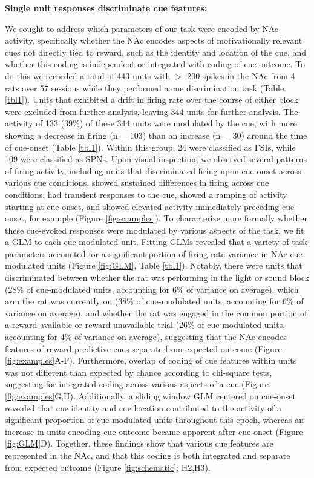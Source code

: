 \documentclass[11pt]{article}
\begin{document}
{\bf Single unit responses discriminate cue features:}

We sought to address which parameters of our task were encoded by NAc activity,
specifically whether the NAc encodes aspects of motivationally relevant cues not
directly tied to reward, such as the identity and location of the cue, and
whether this coding is independent or integrated with coding of cue outcome. To
do this we recorded a total of 443 units with $>$ 200 spikes in the NAc from 4
rats over 57 sessions while they performed a cue discrimination task (Table
\ref{tbl1}). Units that exhibited a drift in firing rate over the course of
either block were excluded from further analysis, leaving 344 units for further
analysis. The activity of 133 (39\%) of these 344 units were modulated by the
cue, with more showing a decrease in firing (n = 103) than an increase (n = 30)
around the time of cue-onset (Table \ref{tbl1}). Within this group, 24 were
classified as FSIs, while 109 were classified as SPNs. Upon visual inspection,
we observed several patterns of firing activity, including units that
discriminated firing upon cue-onset across various cue conditions, showed
sustained differences in firing across cue conditions, had transient responses
to the cue, showed a ramping of activity starting at cue-onset, and showed
elevated activity immediately preceding cue-onset, for example (Figure
\ref{fig:examples}). To characterize more formally whether these cue-evoked
responses were modulated by various aspects of the task, we fit a GLM to each
cue-modulated unit. Fitting GLMs revealed that a variety of task parameters
accounted for a significant portion of firing rate variance in NAc cue-modulated
units (Figure \ref{fig:GLM}, Table \ref{tbl1}). Notably, there were units that
discriminated between whether the rat was performing in the light or sound block
(28\% of cue-modulated units, accounting for 6\% of variance on average), which
arm the rat was currently on (38\% of cue-modulated units, accounting for 6\% of
variance on average), and whether the rat was engaged in the common portion of a
reward-available or reward-unavailable trial (26\% of cue-modulated units,
accounting for 4\% of variance on average), suggesting that the NAc
encodes features of reward-predictive cues separate from expected
outcome (Figure \ref{fig:examples}A-F). Furthermore, overlap of coding of cue
features within units was not different than expected by chance according to
chi-square tests, suggesting for integrated coding across various aspects of a
cue (Figure \ref{fig:examples}G,H). Additionally, a sliding window GLM centered on cue-onset revealed that cue identity and cue location contributed to the activity
of a significant proportion of cue-modulated units throughout this epoch, whereas an increase in units encoding cue outcome became apparent after cue-onset (Figure \ref{fig:GLM}D).  Together, these findings show that various cue features are represented in the NAc, 
and that this coding is both integrated and separate from expected outcome (Figure
\ref{fig:schematic}; H2,H3).
\end{document}
